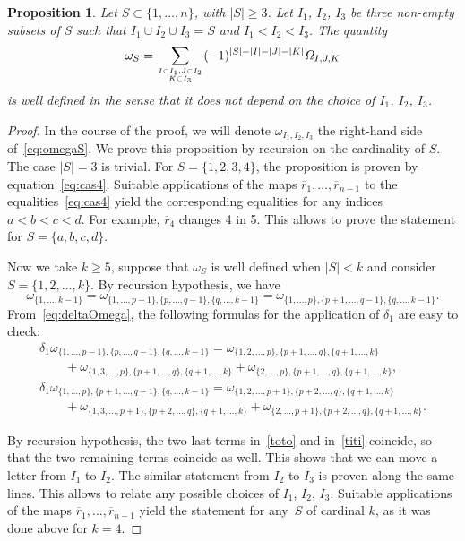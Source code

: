 \documentclass[10pt,a4paper]{amsart}
\numberwithin{equation}{section}
\newcommand\atopn[2]{\genfrac{}{}{0pt}{}{#1}{#2}}
\newtheorem{prop}[theo]{Proposition}
\theoremstyle{definition}
\newcommand{\rb}{\overline{r}}
\begin{document}
\begin{prop}
Let $S\subset\{1,\dots,n\}$, with $|S|\geq3$. Let $I_1$, $I_2$, $I_3$ be three non-empty subsets of $S$ such that $I_1\cup I_2\cup I_3= S$ and $I_1<I_2<I_3$.
The quantity
\begin{equation}\label{eq:omegaS}
\omega_{S} = \sum_{\atopn{I\subset I_1, J\subset I_2}{K\subset I_3}} (-1)^{|S|-|I|-|J|-|K|} \varOmega_{I,J,K}
\end{equation}
is well defined in the sense that it does not depend on the choice of $I_1$, $I_2$, $I_3$.
\end{prop}
\begin{proof}
In the course of the proof, we will denote $\omega_{I_1, I_2, I_3}$ the right-hand side of~\eqref{eq:omegaS}.
We prove this proposition by recursion on the cardinality of $S$. The case $|S|=3$ is trivial. For $S=\{1,2,3,4\}$, the proposition is proven by equation~\eqref{eq:cas4}. Suitable applications of the maps $\rb_1,\dots ,\rb_{n-1}$ to the equalities~\eqref{eq:cas4} yield the corresponding equalities for any indices ${a<b<c<d}$. For example, $\rb_4$ changes 4 in 5.
This allows to prove the statement for $S=\{a,b,c,d\}$.

Now we take $k\geq5$, suppose that $\omega_S$ is well defined when $|S|\!<\!k$ and consider ${S\!=\!\{1,2,\dots ,k\}}$.
By recursion hypothesis, we have
\begin{equation*}
\omega_{\{1,\dots,k-1\}}=\omega_{\{1,\dots,p-1\},\{p,\dots,q-1\},\{q,\dots,k-1\}}=\omega_{\{1,\dots,p\},\{p+1,\dots,q-1\},\{q,\dots,k-1\}}.
\end{equation*}
From~\eqref{eq:deltaOmega}, the following formulas for the application of $\delta_1$ are easy to check:{\samepage
\begin{gather}
\delta_1\omega_{\{1,\dots,p-1\},\{p,\dots,q-1\},\{q,\dots,k-1\}} = \omega_{\{1,2,\dots,p\},\{p+1,\dots,q\},\{q+1,\dots,k\}}
\label{tata}\nonumber\\
\qquad{}+\omega_{\{1,3,\dots,p\},\{p+1,\dots,q\},\{q+1,\dots,k\}}+\omega_{\{2,\dots,p\},\{p+1,\dots,q\},\{q+1,\dots,k\}},\label{toto}\\
\delta_1\omega_{\{1,\dots,p\},\{p+1,\dots,q-1\},\{q,\dots ,k-1\}} = \omega_{\{1,2,\dots,p+1\},\{p+2,\dots,q\},\{q+1,\dots,k\}}
\nonumber\label{tutu}\\
\qquad{}+\omega_{\{1,3,\dots,p+1\},\{p+2,\dots,q\},\{q+1,\dots,k\}}+\omega_{\{2,\dots,p+1\},\{p+2,\dots,q\},\{q+1,\dots,k\}}\label{titi}.
\end{gather}}

\noindent
By recursion hypothesis, the two last terms in~\eqref{toto} and in~\eqref{titi} coincide, so that the two remaining terms coincide as well.
This shows that we can move a letter from $I_1$ to $I_2$. The similar statement from $I_2$ to $I_3$ is proven along the same lines.
This allows to relate any possible choices of $I_1$, $I_2$, $I_3$.
Suitable applications of the maps $\rb_1,\dots ,\rb_{n-1}$ yield the statement for any~$S$ of cardinal $k$, as it was done above for $k=4$.
\end{proof}
\end{document}
